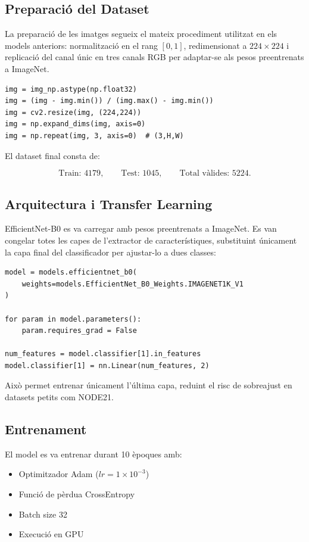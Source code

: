 \documentclass[12pt,a4paper]{article}
\begin{document}
\subsection{Preparació del Dataset}

La preparació de les imatges segueix el mateix procediment utilitzat en els models
anteriors: normalització en el rang $[0,1]$, redimensionat a $224\times224$ i
replicació del canal únic en tres canals RGB per adaptar-se als pesos
preentrenats a ImageNet.

\begin{lstlisting}[style=mypython]
img = img_np.astype(np.float32)
img = (img - img.min()) / (img.max() - img.min())
img = cv2.resize(img, (224,224))
img = np.expand_dims(img, axis=0)
img = np.repeat(img, 3, axis=0)  # (3,H,W)
\end{lstlisting}

El dataset final consta de:

\[
\text{Train: }4179, \qquad
\text{Test: }1045, \qquad
\text{Total vàlides: }5224.
\]

\subsection{Arquitectura i Transfer Learning}

EfficientNet-B0 es va carregar amb pesos preentrenats a ImageNet. Es van congelar totes
les capes de l’extractor de característiques, substituint únicament la capa final del
classificador per ajustar-lo a dues classes:

\begin{lstlisting}[style=mypython]
model = models.efficientnet_b0(
    weights=models.EfficientNet_B0_Weights.IMAGENET1K_V1
)

for param in model.parameters():
    param.requires_grad = False

num_features = model.classifier[1].in_features
model.classifier[1] = nn.Linear(num_features, 2)
\end{lstlisting}

Això permet entrenar únicament l’última capa, reduint el risc de sobreajust
en datasets petits com NODE21.

\subsection{Entrenament}

El model es va entrenar durant 10 èpoques amb:

\begin{itemize}
    \item Optimitzador Adam ($lr = 1 \times 10^{-3}$)
    \item Funció de pèrdua CrossEntropy
    \item Batch size 32
    \item Execució en GPU
\end{itemize}
\end{document}
